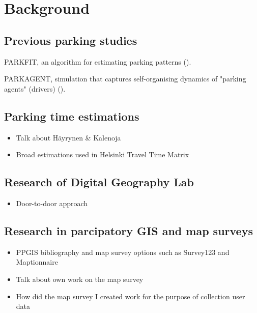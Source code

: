 \section{Background}

\subsection{Previous parking studies}
\justify
PARKFIT, an algorithm for estimating parking patterns (\cite{Levy2015}).

PARKAGENT, simulation that captures self-organising dynamics of "parking agents" (drivers) (\cite{Benenson2008}).

\subsection{Parking time estimations}
\justify
\begin{itemize}
  \item Talk about Häyrynen \& Kalenoja
  \item Broad estimations used in Helsinki Travel Time Matrix
\end{itemize}

\subsection{Research of Digital Geography Lab}
\justify
\begin{itemize}
  \item Door-to-door approach
\end{itemize}

\subsection{Research in parcipatory GIS and map surveys}
\justify
\begin{itemize}
  \item PPGIS bibliography and map survey options such as Survey123 and Maptionnaire
  \item Talk about own work on the map survey
  \item How did the map survey I created work for the purpose of collection user data
\end{itemize}